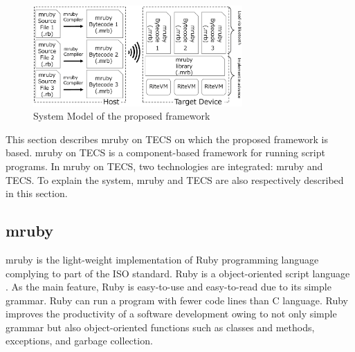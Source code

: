 \documentclass{sig-alternate-05-2015}
\begin{document}
\begin{figure}[t]
    \centering
    \includegraphics[width=8cm,clip]{figure/proposed.eps}
    \vspace{1mm}
    \caption{System Model of the proposed framework}
    \vspace{1mm}
    \label{fig:proposed}
\end{figure}

This section describes mruby on TECS on which the proposed framework is based.
mruby on TECS is a component-based framework for running script programs.
In mruby on TECS, two technologies are integrated: mruby and TECS.
To explain the system, mruby and TECS are also respectively described in this section.

\subsection{mruby}
\label{sec:mruby}
mruby is the light-weight implementation of Ruby programming language complying to part of the ISO standard.
Ruby is a object-oriented script language \cite{url:Ruby}.
As the main feature, Ruby is easy-to-use and easy-to-read due to its simple grammar.
Ruby can run a program with fewer code lines than C language.
Ruby improves the productivity of a software development owing to not only simple grammar but also object-oriented functions such as classes and methods, exceptions, and garbage collection.
\end{document}
